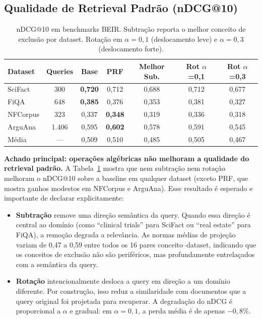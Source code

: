 \documentclass{article}
\begin{document}
\subsection{Qualidade de Retrieval Padrão (nDCG@10)}

\begin{table}[ht]
\centering
\caption{nDCG@10 em benchmarks BEIR. Subtração reporta o melhor conceito de exclusão por dataset. Rotação em $\alpha = 0{,}1$ (deslocamento leve) e $\alpha = 0{,}3$ (deslocamento forte).}
\label{tab:beir_ndcg}
\begin{tabular}{lcccccc}
\toprule
Dataset & Queries & Base & PRF & Melhor Sub. & Rot $\alpha$=0,1 & Rot $\alpha$=0,3 \\
\midrule
SciFact   & 300   & \textbf{0,720} & 0,712 & 0,688 & 0,712 & 0,677 \\
FiQA      & 648   & \textbf{0,385} & 0,376 & 0,353 & 0,381 & 0,327 \\
NFCorpus  & 323   & 0,337 & \textbf{0,348} & 0,319 & 0,336 & 0,318 \\
ArguAna   & 1.406 & 0,595 & \textbf{0,602} & 0,578 & 0,591 & 0,545 \\
\midrule
Média     & ---   & 0,509 & 0,510 & 0,485 & 0,505 & 0,467 \\
\bottomrule
\end{tabular}
\end{table}

\textbf{Achado principal: operações algébricas não melhoram a qualidade do retrieval padrão.} A Tabela~\ref{tab:beir_ndcg} mostra que nem subtração nem rotação melhoram o nDCG@10 sobre a baseline em qualquer dataset (exceto PRF, que mostra ganhos modestos em NFCorpus e ArguAna). Esse resultado é esperado e importante de declarar explicitamente:

\begin{itemize}
\item \textbf{Subtração} remove uma direção semântica da query. Quando essa direção é central ao domínio (como ``clinical trials'' para SciFact ou ``real estate'' para FiQA), a remoção degrada a relevância. As normas médias de projeção variam de 0,47 a 0,59 entre todos os 16 pares conceito--dataset, indicando que os conceitos de exclusão não são periféricos, mas profundamente entrelaçados com a semântica da query.

\item \textbf{Rotação} intencionalmente desloca a query em direção a um domínio diferente. Por construção, isso reduz a similaridade com documentos que a query original foi projetada para recuperar. A degradação do nDCG é proporcional a $\alpha$ e gradual: em $\alpha = 0{,}1$, a perda média é de apenas $-0{,}8\%$.
\end{itemize}
\end{document}
